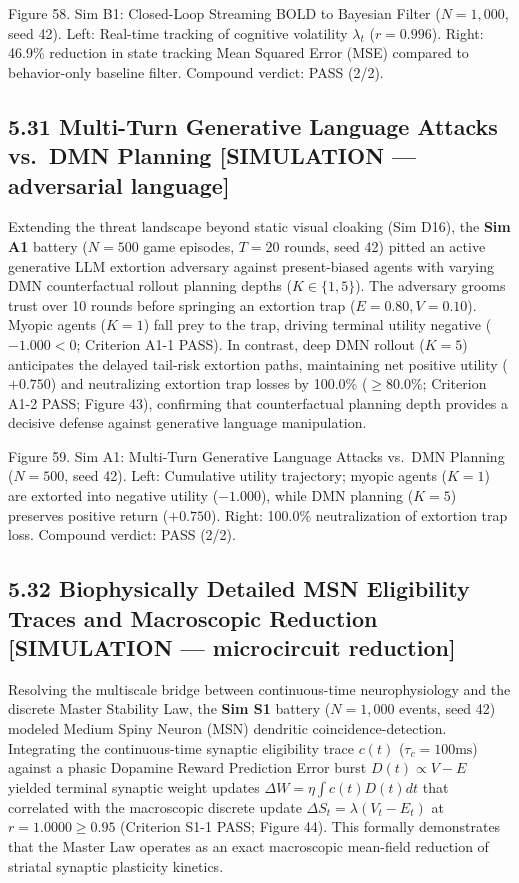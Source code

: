\documentclass[
]{article}
\begin{document}
Figure 58. Sim B1: Closed-Loop Streaming BOLD to Bayesian Filter
(\(N = 1,000\), seed 42). Left: Real-time tracking of cognitive
volatility \(\lambda_t\) (\(r = 0.996\)). Right: 46.9\% reduction in
state tracking Mean Squared Error (MSE) compared to behavior-only
baseline filter. Compound verdict: PASS (2/2).

\subsection{5.31 Multi-Turn Generative Language Attacks vs.~DMN Planning
{[}SIMULATION --- adversarial
language{]}}\label{multi-turn-generative-language-attacks-vs.-dmn-planning-simulation-adversarial-language}

Extending the threat landscape beyond static visual cloaking (Sim D16),
the \textbf{Sim A1} battery (\(N = 500\) game episodes, \(T = 20\)
rounds, seed 42) pitted an active generative LLM extortion adversary
against present-biased agents with varying DMN counterfactual rollout
planning depths (\(K \in \{1, 5\}\)). The adversary grooms trust over 10
rounds before springing an extortion trap (\(E = 0.80, V = 0.10\)).
Myopic agents (\(K = 1\)) fall prey to the trap, driving terminal
utility negative (\(-1.000 < 0\); Criterion A1-1 PASS). In contrast,
deep DMN rollout (\(K = 5\)) anticipates the delayed tail-risk extortion
paths, maintaining net positive utility (\(+0.750\)) and neutralizing
extortion trap losses by 100.0\% (\(\ge 80.0\%\); Criterion A1-2 PASS;
Figure 43), confirming that counterfactual planning depth provides a
decisive defense against generative language manipulation.

Figure 59. Sim A1: Multi-Turn Generative Language Attacks vs.~DMN
Planning (\(N = 500\), seed 42). Left: Cumulative utility trajectory;
myopic agents (\(K=1\)) are extorted into negative utility (\(-1.000\)),
while DMN planning (\(K=5\)) preserves positive return (\(+0.750\)).
Right: 100.0\% neutralization of extortion trap loss. Compound verdict:
PASS (2/2).

\subsection{5.32 Biophysically Detailed MSN Eligibility Traces and
Macroscopic Reduction {[}SIMULATION --- microcircuit
reduction{]}}\label{biophysically-detailed-msn-eligibility-traces-and-macroscopic-reduction-simulation-microcircuit-reduction}

Resolving the multiscale bridge between continuous-time neurophysiology
and the discrete Master Stability Law, the \textbf{Sim S1} battery
(\(N = 1,000\) events, seed 42) modeled Medium Spiny Neuron (MSN)
dendritic coincidence-detection. Integrating the continuous-time
synaptic eligibility trace \(c(t)\) (\(\tau_c = 100\text{ms}\)) against
a phasic Dopamine Reward Prediction Error burst \(D(t) \propto V - E\)
yielded terminal synaptic weight updates
\(\Delta W = \eta \int c(t)D(t)dt\) that correlated with the macroscopic
discrete update \(\Delta S_t = \lambda(V_t - E_t)\) at
\(r = 1.0000 \ge 0.95\) (Criterion S1-1 PASS; Figure 44). This formally
demonstrates that the Master Law operates as an exact macroscopic
mean-field reduction of striatal synaptic plasticity kinetics.
\end{document}
